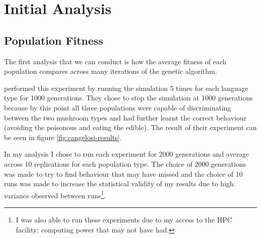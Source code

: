 \documentclass[12pt,a4paper,twoside,openright]{report}
\begin{document}
\section{Initial Analysis}

\subsection{Population Fitness}\label{section:popfit}

 

 
The first analysis that we can conduct is how the average fitness of each population compares across many iterations of the genetic algorithm.

\citet{Cangelosi1998} performed this experiment by running the simulation 5 times for each language type for 1000 generations. They chose to stop the simulation at 1000 generations because by this point all three populations were capable of discriminating between the two mushroom types and had further learnt the correct behaviour (avoiding the poisonous and eating the edible). The result of their experiment can be seen in figure \ref{fig:cangelosi-results}.

In my analysis I chose to run each experiment for 2000 generations and average across 10 replications for each population type. The choice of 2000 generations was made to try to find behaviour that \citet{Cangelosi1998} may have missed and the choice of 10 runs was made to increase the statistical validity of my results due to high variance observed between runs\footnote{I was also able to run these experiments due to my access to the HPC facility; computing power that \citet{Cangelosi1998} may not have had.}. 
\end{document}
